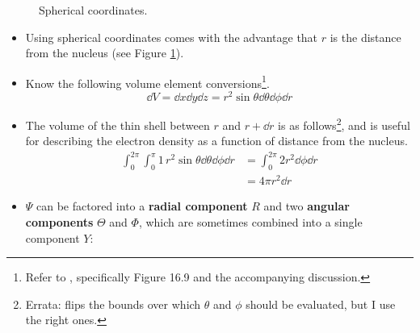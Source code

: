 \documentclass[../notes.tex]{subfiles}
\begin{document}
\begin{itemize}
\begin{figure}[h!]
        \caption{Spherical coordinates.}
        \label{fig:sphericalCoords}
    \end{figure}
    \begin{itemize}
        \item Using spherical coordinates comes with the advantage that $r$ is the distance from the nucleus (see Figure \ref{fig:sphericalCoords}).
        \pagebreak
        \item Know the following volume element conversions\footnote{Refer to \textcite{bib:CAAGThomasNotes}, specifically Figure 16.9 and the accompanying discussion.}.
        \begin{equation*}
            \dd{V} = \dd{x}\dd{y}\dd{z}
            = r^2\sin\theta\dd{\theta}\dd{\phi}\dd{r}
        \end{equation*}
        \item The volume of the thin shell between $r$ and $r+\dd{r}$ is as follows\footnote{Errata: \textcite{bib:MiesslerFischerTarr} flips the bounds over which $\theta$ and $\phi$ should be evaluated, but I use the right ones.}, and is useful for describing the electron density as a function of distance from the nucleus.
        \begin{align*}
            \int_0^{2\pi}\int_0^\pi1\, r^2\sin\theta\dd{\theta}\dd{\phi}\dd{r} &= \int_0^{2\pi}2r^2\dd{\phi}\dd{r}\\
            &= 4\pi r^2\dd{r}
        \end{align*}
        \item $\Psi$ can be factored into a \textbf{radial component} $R$ and two \textbf{angular components} $\Theta$ and $\Phi$, which are sometimes combined into a single component $Y$:

\end{itemize}
\end{itemize}
\end{document}
